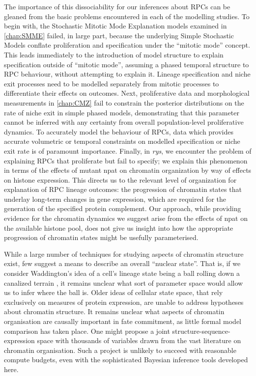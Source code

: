 \documentclass{ut-thesis}
\begin{document}
\begin{NoHyper}
The importance of this dissociability for our inferences about RPCs can be gleaned from the basic problems encountered in each of the modelling studies. To begin with, the Stochastic Mitotic Mode Explanation models examined in \autoref{chap:SMME} failed, in large part, because the underlying Simple Stochastic Models conflate proliferation and specification under the ``mitotic mode'' concept. This leads immediately to the introduction of model structure to explain specification outside of ``mitotic mode'', assuming a phased temporal structure to RPC behaviour, without attempting to explain it. Lineage specification and niche exit processes need to be modelled separately from mitotic processes to differentiate their effects on outcomes. Next, proliferative data and morphological measurements in \autoref{chap:CMZ} fail to constrain the posterior distributions on the rate of niche exit in simple phased models, demonstrating that this parameter cannot be inferred with any certainty from overall population-level proliferative dynamics. To accurately model the behaviour of RPCs, data which provides accurate volumetric or temporal constraints on modelled specification or niche exit rate is of paramount importance. Finally, in \textit{rys}, we encounter the problem of explaining RPCs that proliferate but fail to specify; we explain this phenomenon in terms of the effects of mutant npat on chromatin organization by way of effects on histone expression. This directs us to the relevant level of organization for explanation of RPC lineage outcomes: the progression of chromatin states that underlay long-term changes in gene expression, which are required for the generation of the specified protein complement. Our  approach, while providing evidence for the chromatin dynamics we suggest arise from the effects of npat on the available histone pool, does not give us insight into how the appropriate progression of chromatin states might be usefully parameterised.

While a large number of techniques for studying aspects of chromatin structure exist, few suggest a means to describe an overall ``nuclear state''. That is, if we consider Waddington's idea of a cell's lineage state being a ball rolling down a canalized terrain \cite{Waddington1957}, it remains unclear what sort of parameter space would allow us to infer where the ball is. Older ideas of cellular state space, that rely exclusively on measures of protein expression, are unable to address hypotheses about chromatin structure. It remains unclear what aspects of chromatin organisation are causally important in fate commitment, as little formal model comparison has taken place. One might propose a joint structure-sequence-expression space with thousands of variables drawn from the vast literature on chromatin organisation. Such a project is unlikely to succeed with reasonable compute budgets, even with the sophisticated Bayesian inference tools developed here.


\end{NoHyper}
\end{document}
